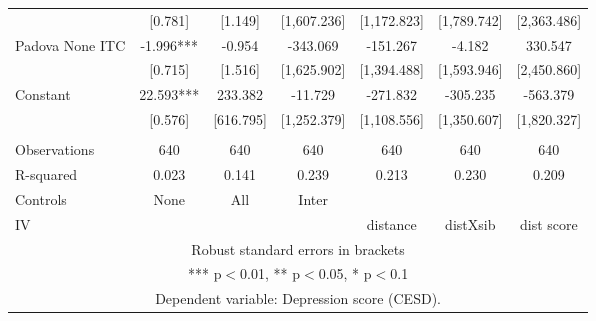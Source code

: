\begin{tabular}{lcccccc}
 & [0.781] & [1.149] & [1,607.236] & [1,172.823] & [1,789.742] & [2,363.486] \\
Padova None ITC & -1.996*** & -0.954 & -343.069 & -151.267 & -4.182 & 330.547 \\
 & [0.715] & [1.516] & [1,625.902] & [1,394.488] & [1,593.946] & [2,450.860] \\
Constant & 22.593*** & 233.382 & -11.729 & -271.832 & -305.235 & -563.379 \\
 & [0.576] & [616.795] & [1,252.379] & [1,108.556] & [1,350.607] & [1,820.327] \\
 &  &  &  &  &  &  \\
Observations & 640 & 640 & 640 & 640 & 640 & 640 \\
R-squared & 0.023 & 0.141 & 0.239 & 0.213 & 0.230 & 0.209 \\
Controls & None & All & Inter &  &  &  \\
 IV &  &  &  & distance & distXsib & dist score \\ \hline
\multicolumn{7}{c}{ Robust standard errors in brackets} \\
\multicolumn{7}{c}{ *** p$<$0.01, ** p$<$0.05, * p$<$0.1} \\
\multicolumn{7}{c}{ Dependent variable: Depression score (CESD).} \\
\end{tabular}
